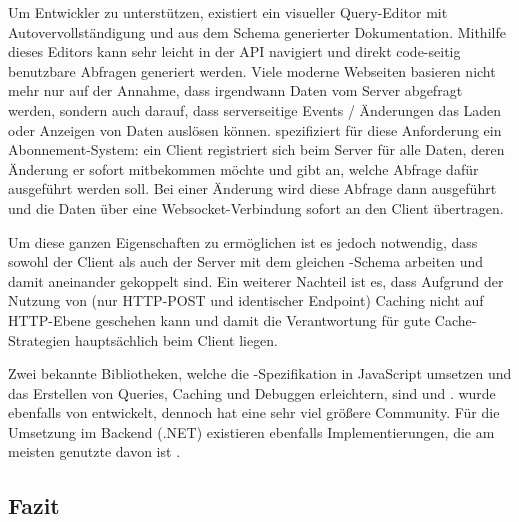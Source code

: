 

Um Entwickler zu unterstützen, existiert ein visueller Query-Editor  mit Autovervollständigung und aus dem Schema generierter Dokumentation. Mithilfe dieses Editors kann sehr leicht in der API navigiert und direkt code-seitig benutzbare Abfragen generiert werden.
Viele moderne Webseiten basieren nicht mehr nur auf der Annahme, dass irgendwann Daten vom Server abgefragt werden, sondern auch darauf, dass serverseitige Events / Änderungen das Laden oder Anzeigen von Daten auslösen können.  spezifiziert für diese Anforderung ein Abonnement-System: ein Client registriert sich beim Server für alle Daten, deren Änderung er sofort mitbekommen möchte und gibt an, welche Abfrage dafür ausgeführt werden soll. Bei einer Änderung wird diese Abfrage dann ausgeführt und die Daten über eine Websocket-Verbindung sofort an den Client übertragen.

Um diese ganzen Eigenschaften zu ermöglichen ist es jedoch notwendig, dass sowohl der Client als auch der Server mit dem gleichen -Schema arbeiten und damit aneinander gekoppelt sind.
Ein weiterer Nachteil ist es, dass Aufgrund der Nutzung von  (nur HTTP-POST und identischer Endpoint) Caching nicht auf HTTP-Ebene geschehen kann und damit die Verantwortung für gute Cache-Strategien hauptsächlich beim Client liegen.

Zwei bekannte Bibliotheken, welche die -Spezifikation in JavaScript umsetzen und das Erstellen von Queries, Caching und Debuggen erleichtern, sind  und .  wurde ebenfalls von  entwickelt, dennoch hat  eine sehr viel größere Community. Für die Umsetzung im Backend (.NET) existieren ebenfalls Implementierungen, die am meisten genutzte davon ist .

\subsection{Fazit}

